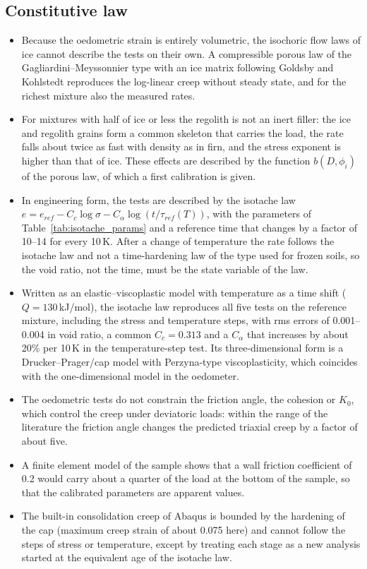 \subsection{Constitutive law}
\begin{itemize}
    \item Because the oedometric strain is entirely volumetric, the isochoric flow laws of ice cannot describe the tests on their own. A compressible porous law of the Gagliardini--Meyssonnier type with an ice matrix following Goldsby and Kohlstedt reproduces the log-linear creep without steady state, and for the richest mixture also the measured rates.
    \item For mixtures with half of ice or less the regolith is not an inert filler: the ice and regolith grains form a common skeleton that carries the load, the rate falls about twice as fast with density as in firn, and the stress exponent is higher than that of ice. These effects are described by the function $b(D,\phi_i)$ of the porous law, of which a first calibration is given.
    \item In engineering form, the tests are described by the isotache law $e = e_{ref} - C_c\log\sigma - C_\alpha\log(t/\tau_{ref}(T))$, with the parameters of Table~\ref{tab:isotache_params} and a reference time that changes by a factor of 10--14 for every 10\,K. After a change of temperature the rate follows the isotache law and not a time-hardening law of the type used for frozen soils, so the void ratio, not the time, must be the state variable of the law.
    \item Written as an elastic--viscoplastic model with temperature as a time shift ($Q = 130$\,kJ/mol), the isotache law reproduces all five tests on the reference mixture, including the stress and temperature steps, with rms errors of 0.001--0.004 in void ratio, a common $C_c = 0.313$ and a $C_\alpha$ that increases by about 20\% per 10\,K in the temperature-step test. Its three-dimensional form is a Drucker--Prager/cap model with Perzyna-type viscoplasticity, which coincides with the one-dimensional model in the oedometer.
    \item The oedometric tests do not constrain the friction angle, the cohesion or $K_0$, which control the creep under deviatoric loads: within the range of the literature the friction angle changes the predicted triaxial creep by a factor of about five.
    \item A finite element model of the sample shows that a wall friction coefficient of 0.2 would carry about a quarter of the load at the bottom of the sample, so that the calibrated parameters are apparent values.
    \item The built-in consolidation creep of Abaqus is bounded by the hardening of the cap (maximum creep strain of about 0.075 here) and cannot follow the steps of stress or temperature, except by treating each stage as a new analysis started at the equivalent age of the isotache law.
\end{itemize}

